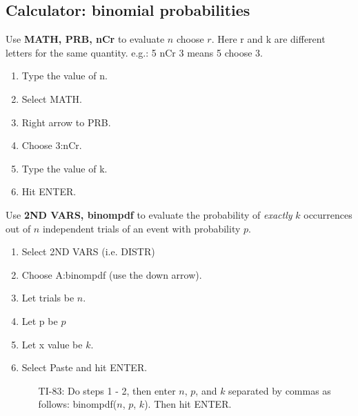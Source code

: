 \subsection{Calculator: binomial probabilities}
\label{calculatorBinomial}

\begin{termBox}{
Use \textbf{MATH, PRB, nCr} to evaluate $n$ choose $r$. Here r and k are different letters for the same quantity. e.g.: 5 nCr 3 means 5 choose 3.
\begin{enumerate}
\setlength{\itemsep}{0mm}
\item Type the value of n.
\item Select MATH.
\item Right arrow to PRB.
\item Choose 3:nCr.
\item Type the value of k.
\item Hit ENTER.
\end{enumerate}}
\end{termBox}


\begin{termBox}{ 
Use \textbf{2ND VARS, binompdf} to evaluate the probability of \emph{exactly} $k$ occurrences out of $n$ independent trials of an event with probability $p$. 
\begin{enumerate}
\setlength{\itemsep}{0mm}
\item Select 2ND VARS (i.e. DISTR)
\item Choose A:binompdf  (use the down arrow).
\item Let trials be $n$.
\item Let p be $p$
\item Let x value be $k$.
\item Select Paste and hit ENTER.\vspace{-1.5mm}
\begin{itemize}
\item[TI-83: ] Do steps 1 - 2, then enter $n$, $p$, and $k$ separated by commas as follows:  binompdf($n$, $p$, $k$). Then hit ENTER. 
\end{itemize}
\end{enumerate}
}
\end{termBox}

